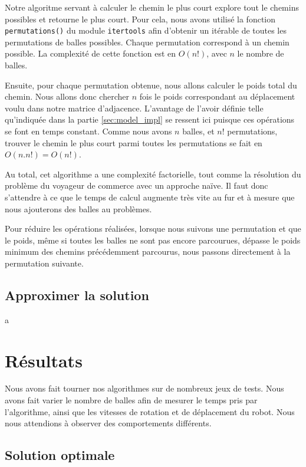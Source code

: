 \documentclass[12pt]{article}
\begin{document}
    Notre algoritme servant à calculer le chemin le plus court explore tout le chemins possibles et retourne le plus court. Pour cela, nous avons utilisé la fonction \verb|permutations()| du module \verb|itertools| afin d'obtenir un itérable de toutes les permutations de balles possibles. Chaque permutation correspond à un chemin possible. La complexité de cette fonction est en $O(n!)$, avec $n$ le nombre de balles.

    Ensuite, pour chaque permutation obtenue, nous allons calculer le poids total du chemin. Nous allons donc chercher $n$ fois le poids correspondant au déplacement voulu dans notre matrice d'adjacence. L'avantage de l'avoir définie telle qu'indiquée dans la partie \ref{sec:model_impl} se ressent ici puisque ces opérations se font en temps constant. Comme nous avons $n$ balles, et $n!$ permutations, trouver le chemin le plus court parmi toutes les permutations se fait en $O(n.n!) = O(n!)$.

    Au total, cet algorithme a une complexité factorielle, tout comme la résolution du problème du voyageur de commerce avec un approche naïve. Il faut donc s'attendre à ce que le temps de calcul augmente très vite au fur et à mesure que nous ajouterons des balles au problèmes.

    Pour réduire les opérations réalisées, lorsque nous suivons une permutation et que le poids, même si toutes les balles ne sont pas encore parcourues, dépasse le poids minimum des chemins précédemment parcourus, nous passons directement à la permutation suivante.

    \subsection{Approximer la solution}
    \label{subsec:sol_approch}
    a

    \section{Résultats}
    \label{sec:result}

    Nous avons fait tourner nos algorithmes sur de nombreux jeux de tests. Nous avons fait varier le nombre de balles afin de mesurer le temps pris par l'algorithme, ainsi que les vitesses de rotation et de déplacement du robot. Nous nous attendions à observer des comportements différents.

    \subsection{Solution optimale}
    \label{subsec:result_opt}
\end{document}
